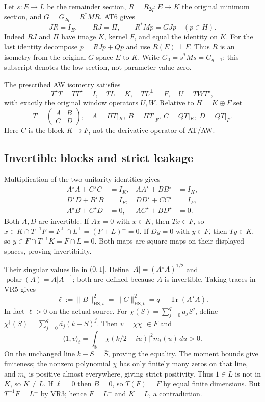 Let \(s:E\to L\) be the remainder section, \(R=R_{2q}:E\to K\) the original minimum section, and \(G=G_{2q}=R^*MR\). AT6 gives
\[
 JR=I_E,\qquad RJ=\Pi,\qquad R^*Mp=GJp\quad(p\in H).
 \tag{VR2}
\]
Indeed \(RJ\) and \(\Pi\) have image \(K\), kernel \(F\), and equal the identity on \(K\). For the last identity decompose \(p=RJp+Qp\) and use \(R(E)\perp F\). Thus \(R\) is an isometry from the original \(G\)-space \(E\) to \(K\). Write \(G_0=s^*Ms=G_{q-1}\); this subscript denotes the low section, not parameter value zero.

The prescribed AW isometry satisfies
\[
 T^\star T=TT^\star=I,\quad TL=K,\quad TL^\perp=F,\quad
 U=TWT^\star,
 \tag{VR3}
\]
with exactly the original window operators \(U,W\). Relative to \(H=K\oplus F\) set
\[
 T=\begin{pmatrix}A&B\\ C&D\end{pmatrix},\quad
 A=\Pi T|_K,\ B=\Pi T|_F,\ C=QT|_K,\ D=QT|_F.
 \tag{VR4}
\]
Here \(C\) is the block \(K\to F\), not the derivative operator of AT/AW.

\subsection{Invertible blocks and strict leakage}

Multiplication of the two unitarity identities gives
\[
 \begin{aligned}
 A^\star A+C^\star C&=I_K,&AA^\star+BB^\star&=I_K,\\
 D^\star D+B^\star B&=I_F,&DD^\star+CC^\star&=I_F,\\
 A^\star B+C^\star D&=0,&AC^\star+BD^\star&=0.
 \end{aligned} \tag{VR5}
\]
Both \(A,D\) are invertible. If \(Ax=0\) with \(x\in K\), then \(Tx\in F\), so
\(x\in K\cap T^{-1}F=F^\perp\cap L^\perp=(F+L)^\perp=0\).
If \(Dy=0\) with \(y\in F\), then \(Ty\in K\), so
\(y\in F\cap T^{-1}K=F\cap L=0\).
Both maps are square maps on their displayed spaces, proving invertibility.

Their singular values lie in \((0,1]\). Define \(|A|=(A^\star A)^{1/2}\) and \(\operatorname{polar}(A)=A|A|^{-1}\); both are defined because \(A\) is invertible. Taking traces in VR5 gives
\[
 \ell:=\|B\|_{\mathrm{HS},t}^2
 =\|C\|_{\mathrm{HS},t}^2
 =q-\operatorname{Tr}(A^\star A).
 \tag{VR6}
\]
In fact \(\ell>0\) on the actual source. For
\(\chi(S)=\sum_{j=0}^q a_jS^j\), define
\(\chi^\dagger(S)=\sum_{j=0}^q\overline{a_j}(k-S)^j\).
Then \(v=\chi\chi^\dagger\in F\) and
\[
 \langle1,v\rangle_t
 =\int_{\mathbb R}|\chi(k/2+iu)|^2m_t(u)\,du>0.
 \tag{VR7}
\]
On the unchanged line \(k-S=\overline S\), proving the equality. The moment bounds give finiteness; the nonzero polynomial \(\chi\) has only finitely many zeros on that line, and \(m_t\) is positive almost everywhere, giving strict positivity. Thus \(1\in L\) is not in \(K\), so \(K\ne L\). If \(\ell=0\) then \(B=0\), so \(T(F)=F\) by equal finite dimensions. But \(T^{-1}F=L^\perp\) by VR3; hence \(F=L^\perp\) and \(K=L\), a contradiction.

